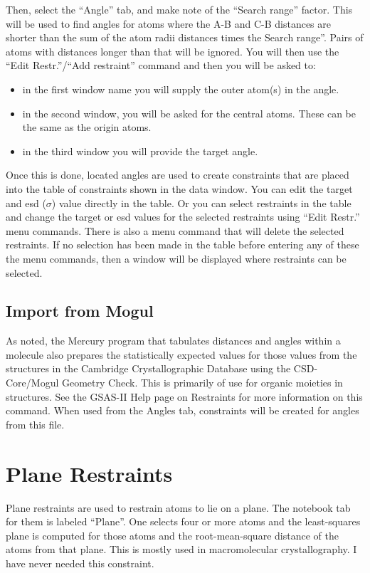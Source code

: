 Then, select the ``Angle'' tab, and make note of the ``Search range'' factor. This will be used to find angles for atoms where the A-B and C-B distances are shorter than the sum of the atom radii distances times the Search range''. Pairs of atoms with distances longer than that will be ignored. 
You will then use the  ``Edit Restr.''/``Add restraint'' command and then you will be asked to: 
\begin{itemize}
    \item in the first window name you will supply the outer atom(s) in the angle. 
    \item in the second window, you will be asked for the central atoms. These can be the same as the origin atoms. 
    \item in the third window you will provide the target angle.
\end{itemize}
Once this is done, located angles are used to create constraints that are placed into the table of constraints shown in the data window. You can edit the target and esd ($\sigma$) value directly in the table. Or you can select restraints in the table and change the target or esd values for the selected restraints using ``Edit Restr.'' menu commands. There is also a menu command that will delete the selected restraints. If no selection has been made in the table before entering any of these the menu commands, then a window will be displayed where restraints can be selected. 

\subsection{Import from Mogul}
As noted, the Mercury program that tabulates distances and angles within a molecule also prepares the statistically expected values for those values from the structures in the Cambridge Crystallographic Database using the CSD-Core/Mogul Geometry Check. This is primarily of use for organic moieties in structures. See the GSAS-II Help page on Restraints for more information on this command. When used from the Angles tab, constraints will be created for  angles from this file. 

\section{Plane Restraints}
Plane restraints are used to restrain atoms to lie on a plane. The notebook tab for them is labeled ``Plane''. One selects four or more atoms and the least-squares plane is computed for those atoms and the root-mean-square distance of the atoms from that plane. This is mostly used in macromolecular crystallography. I have never needed this constraint. 

